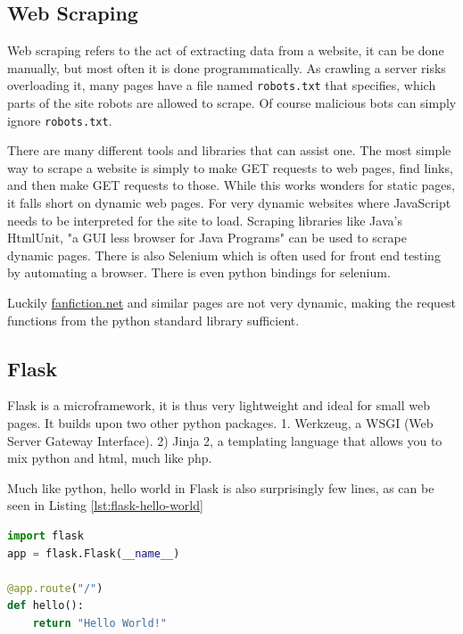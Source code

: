 \documentclass[]{report}   %
\begin{document}
\subsection{Web Scraping}
Web scraping refers to the act of extracting data from a website, it can be
done manually, but most often it is done programmatically. As crawling a server
risks overloading it, many pages have a file named
\texttt{robots.txt}\cite{robots} that specifies, which parts of the site robots
are allowed to scrape. Of course malicious bots can simply ignore \texttt{robots.txt}. 

There are many different tools and libraries that can assist one. The most
simple way to scrape a website is simply to make GET requests to web pages,
find links, and then make GET requests to those. While this works wonders for
static pages, it falls short on dynamic web pages. For very dynamic websites where
JavaScript needs to be interpreted for the site to load.
Scraping libraries like Java's HtmlUnit, "a GUI less browser for Java
Programs"\cite{java_htmlunit} can be used to scrape dynamic pages. There is also
Selenium\cite{selenium} which is often used for front end testing by automating
a browser. There is even python bindings for selenium\cite{py_selenium}.

Luckily \url{fanfiction.net} and similar pages are not very dynamic, making
the request functions from the python standard library sufficient.

\subsection{Flask}
Flask\cite{flask} is a microframework, it is thus very lightweight and ideal for small
web pages. It builds upon two other python packages. 1. Werkzeug, a WSGI (Web
Server Gateway Interface). 2) Jinja 2, a templating language that allows you to
mix python and html, much like php.

Much like python, hello world in Flask is also surprisingly few lines, as can
be seen in Listing \ref{lst:flask-hello-world}

\begin{minipage}{\linewidth}
\begin{lstlisting}[language=python, label={lst:flask-hello-world}, 
                   caption={Flask Hello World}]
import flask
app = flask.Flask(__name__)

@app.route("/")
def hello():
    return "Hello World!"
\end{lstlisting}
\end{minipage}
\end{document}

